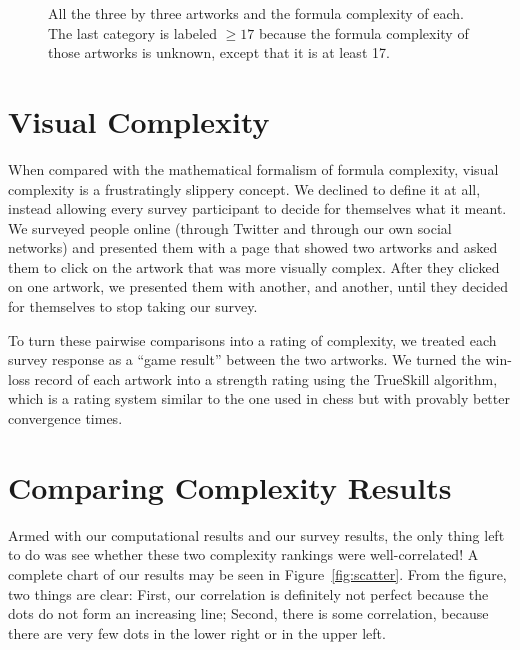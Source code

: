 \documentclass[11pt]{article}
\begin{document}
\begin{figure}
\begin{center}
\begin{sideways}

\end{sideways}
\end{center}

\caption{All the three by three artworks and the formula complexity of each.  The last category is labeled $\ge 17$ because the formula complexity of those artworks is unknown, except that it is at least 17.}
\label{fig:allthe3x3}
\end{figure}

\section*{Visual Complexity}

When compared with the mathematical formalism of formula complexity, visual
complexity is a frustratingly slippery concept.  We declined to define it at
all, instead allowing every survey participant to decide for themselves what it
meant.  We surveyed people online (through Twitter and through our own social
networks) and presented them with a page that showed two artworks and asked
them to click on the artwork that was more visually complex.  After they
clicked on one artwork, we presented them with another, and another, until
they decided for themselves to stop taking our survey.

To turn these pairwise comparisons into a rating of complexity,
we treated each survey response as a ``game result'' between the
two artworks. We turned the win-loss record of each artwork into a
strength rating using the TrueSkill algorithm\cite{trueskill}, which is a
rating system similar to the one used in chess but with provably better
convergence times.

\section*{Comparing Complexity Results}

Armed with our computational results and our survey results, the only thing
left to do was see whether these two complexity rankings were well-correlated!
A complete chart of our results may be seen in Figure~\ref{fig:scatter}.  From
the figure, two things are clear: First, our correlation is definitely not
perfect because the dots do not form an increasing line; Second, there is some
correlation, because there are very few dots in the lower right or in the upper
left.
\end{document}
